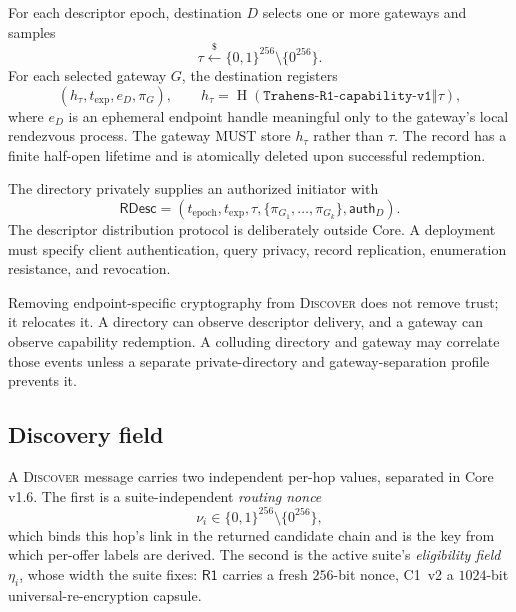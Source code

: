 \documentclass[11pt,oneside]{article}
\newcommand{\concat}{\mathbin\Vert}
\newcommand{\sample}{\xleftarrow{\$}}
\newcommand{\Hash}{\operatorname{H}}
\newcommand{\Rone}{\ensuremath{\mathsf{R1}}}
\newcommand{\code}[1]{\texttt{#1}}
\begin{document}
For each descriptor epoch, destination $D$ selects one or more gateways and samples
\begin{equation}
\tau \sample \{0,1\}^{256}\setminus\{0^{256}\}.
\label{eq:capability}
\end{equation}
For each selected gateway $G$, the destination registers
\begin{equation}
\left(h_\tau,t_{\mathrm{exp}},e_D,\pi_G\right),\qquad
h_\tau=\Hash(\code{Trahens-R1-capability-v1}\concat\tau),
\label{eq:registration}
\end{equation}
where $e_D$ is an ephemeral endpoint handle meaningful only to the gateway's local rendezvous process. The gateway MUST store $h_\tau$ rather than $\tau$. The record has a finite half-open lifetime and is atomically deleted upon successful redemption.

The directory privately supplies an authorized initiator with
\begin{equation}
\mathsf{RDesc}=\left(t_{\mathrm{epoch}},t_{\mathrm{exp}},\tau,
\{\pi_{G_1},\ldots,\pi_{G_k}\},\mathsf{auth}_D\right).
\label{eq:rdesc}
\end{equation}
The descriptor distribution protocol is deliberately outside Core. A deployment must specify client authentication, query privacy, record replication, enumeration resistance, and revocation.

\begin{warningbox}
Removing endpoint-specific cryptography from \textsc{Discover} does not remove trust; it relocates it. A directory can observe descriptor delivery, and a gateway can observe capability redemption. A colluding directory and gateway may correlate those events unless a separate private-directory and gateway-separation profile prevents it.
\end{warningbox}

\subsection{Discovery field}

A \textsc{Discover} message carries two independent per-hop values, separated in Core v1.6. The first is a suite-independent \emph{routing nonce}
\begin{equation}
\nu_i\in\{0,1\}^{256}\setminus\{0^{256}\},
\end{equation}
which binds this hop's link in the returned candidate chain and is the key from which per-offer labels are derived. The second is the active suite's \emph{eligibility field} $\eta_i$, whose width the suite fixes: \Rone{} carries a fresh $256$-bit nonce, C1~v2 a $1024$-bit universal-re-encryption capsule.
\end{document}
